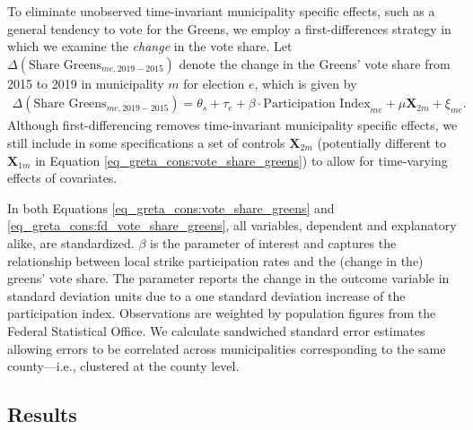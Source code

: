 To eliminate unobserved time-invariant municipality specific effects, such as a general tendency to vote for the Greens, we employ a  first-differences strategy in which we examine the \textit{change} in the vote share. Let $\Delta(\text{Share Greens}_{me,2019-2015})$ denote the change in the Greens' vote share from 2015 to 2019 in municipality $m$ for election $e$, which is given by
\begin{align}
	\Delta(\text{Share Greens}_{me,2019-2015}) = \theta_s + \tau_e + \beta\cdot\text{Participation Index}_{me} + \mu \mathbf{X}_{2m} + \xi_{me}.\label{eq_greta_cons:fd_vote_share_greens}
\end{align}
Although first-differencing removes time-invariant municipality specific effects, we still include in some specifications a set of controls $\mathbf{X}_{2m}$ (potentially different to $\mathbf{X}_{1m}$ in Equation \ref{eq_greta_cons:vote_share_greens}) to allow for time-varying effects of covariates.


In both Equations \ref{eq_greta_cons:vote_share_greens} and \ref{eq_greta_cons:fd_vote_share_greens}, all variables, dependent and explanatory alike, are standardized. $\beta$ is the parameter of interest and captures the relationship between local strike participation rates and the (change in the) greens' vote share. The parameter reports the change in the outcome variable in standard deviation units due to a one standard deviation increase of the participation index. Observations are weighted by population figures from the Federal Statistical Office. We calculate sandwiched standard error estimates allowing errors to be correlated across municipalities corresponding to the same county---i.e., clustered at the county level.





\subsection{Results}

